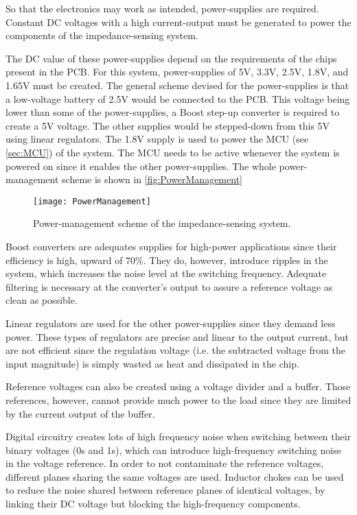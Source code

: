 So that the electronics may work as intended, power-supplies are required. Constant DC voltages with a high current-output must be generated to power the components of the impedance-sensing system. \par

The DC value of these power-supplies depend on the requirements of the chips present in the PCB. For this system, power-supplies of 5V, 3.3V, 2.5V, 1.8V, and 1.65V must be created. The general scheme devised for the power-supplies is that a low-voltage battery of 2.5V would be connected to the PCB. This voltage being lower than some of the power-supplies, a Boost step-up converter is required to create a 5V voltage. The other supplies would be stepped-down from this 5V using linear regulators. The 1.8V supply is used to power the MCU (see \autoref{sec:MCU}) of the system. The MCU needs to be active whenever the system is powered on since it enables the other power-supplies. The whole power-management scheme is shown in \autoref{fig:PowerManagement} \par
\begin{figure}[h]
    \centering
    \texttt{[image: PowerManagement]}
    \caption{Power-management scheme of the impedance-sensing system.}
    \label{fig:PowerManagement}
\end{figure}

Boost converters are adequates supplies for high-power applications since their efficiency is high, upward of 70\%. They do, however, introduce ripples in the system, which increases the noise level at the switching frequency. Adequate filtering is necessary at the converter's output to assure a reference voltage as clean as possible.

Linear regulators are used for the other power-supplies since they demand less power. These types of regulators are precise and linear to the output current, but are not efficient since the regulation voltage (i.e. the subtracted voltage from the input magnitude) is simply wasted as heat and dissipated in the chip. \par

Reference voltages can also be created using a voltage divider and a buffer. Those references, however, cannot provide much power to the load since they are limited by the current output of the buffer. \par

Digital circuitry creates lots of high frequency noise when switching between their binary voltages (0s and 1s), which can introduce high-frequency switching noise in the voltage reference. In order to not contaminate the reference voltages, different planes sharing the same voltages are used. Inductor chokes can be used to reduce the noise shared between reference planes of identical voltages, by linking their DC voltage but blocking the high-frequency components.   \par